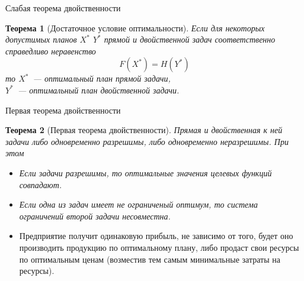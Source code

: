 \documentclass[unicode,11pt,notheorems,xcolor=table]{beamer}
\newtheorem{theorem}{Теорема}
\begin{document}
\begin{frame}{Слабая теорема двойственности}{}
	\begin{theorem}[Достаточное условие оптимальности]
		Если для некоторых  допустимых планов 
		$X^*$ $Y^*$
		прямой и двойственной задач соответственно справедливо неравенство 
		$$
		F(X^*) =H(Y^*)
		$$
		то $X^*$~--- оптимальный план прямой задачи,\\ $Y^*$~--- оптимальный план двойственной задачи.
	\end{theorem}

%
%	

\end{frame}	


\begin{frame}{Первая теорема двойственности}{}
	\begin{theorem}[Первая теорема двойственности]
		Прямая и двойственная к ней задачи либо одновременно разрешимы, либо одновременно неразрешимы.
		При этом
		\begin{itemize}
			\item 
			Если задачи разрешимы, то оптимальные значения целевых функций совпадают.
			\item 
			Если одна из задач имеет не ограниченый оптимум, то система ограничений второй задачи несовместна.
		\end{itemize}
	\end{theorem}
	
	\begin{itemize}
	\item 
		 Предприятие получит одинаковую прибыль, не зависимо от того, будет оно производить продукцию по оптимальному плану, либо продаст свои ресурсы по оптимальным ценам (возместив тем самым минимальные затраты на ресурсы).		
	 \end{itemize}	

\end{frame}
\end{document}

